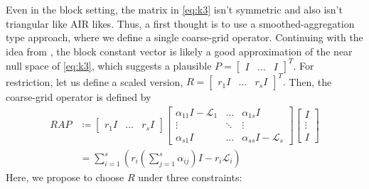 \documentclass[a4paper,10pt]{article}
\begin{document}
Even in the block setting, the matrix in \eqref{eq:k3} isn't symmetric and also isn't
triangular like AIR likes. Thus, a first thought is to use a smoothed-aggregation
type approach, where we define a single coarse-grid operator. Continuing with the
idea from , the block constant vector is likely a good
approximation of the near null space of \eqref{eq:k3}, which suggests a
plausible $P = \begin{bmatrix} I & \hdots & I\end{bmatrix}^T.$ For restriction,
let us define a scaled version, $R = \begin{bmatrix} r_1I & \hdots & r_sI\end{bmatrix}^T.$ 
Then, the coarse-grid operator is defined by 
%
\begin{align}\nonumber
RAP & \coloneqq \begin{bmatrix} r_1I & \hdots & r_sI\end{bmatrix}
	\begin{bmatrix} \alpha_{11} I - \mathcal{L}_1 & ... & \alpha_{1s}I  \\
		\vdots & \ddots & \vdots \\ \alpha_{s1}I &  ... & \alpha_{ss}I - \mathcal{L}_s\end{bmatrix}
	\begin{bmatrix} I \\ \vdots \\ I\end{bmatrix} \\
& = \sum_{i=1}^s \left( r_i \left(\sum_{j=1}^s \alpha_{ij}\right)I - r_i\mathcal{L}_i \right)\label{eq:cg}
\end{align}
%
Here, we propose to choose $R$ under three constraints:
\end{document}
